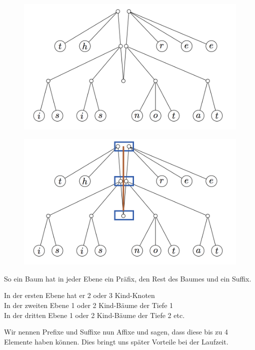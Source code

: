 \documentclass{beamer}
\begin{document}
\begin{frame}
\begin{figure}
\includegraphics[width=\textwidth]{finger-tree-2.png}
\end{figure}
\end{frame}

\begin{frame}
\begin{figure}
\includegraphics[width=\textwidth]{finger-tree-3.png}
\end{figure}
\end{frame}

\begin{frame}
So ein Baum hat in jeder Ebene ein Präfix, den Rest des Baumes und ein Suffix.\\\par\pause
In der ersten Ebene hat er 2 oder 3 Kind-Knoten\\
In der zweiten Ebene 1 oder 2 Kind-Bäume der Tiefe 1\\
In der dritten Ebene 1 oder 2 Kind-Bäume der Tiefe 2 etc.\\\par\pause
Wir nennen Prefixe und Suffixe nun Affixe und sagen, dass diese bis zu 4 Elemente haben können. Dies bringt uns später Vorteile bei der Laufzeit.
\end{frame}
\end{document}
